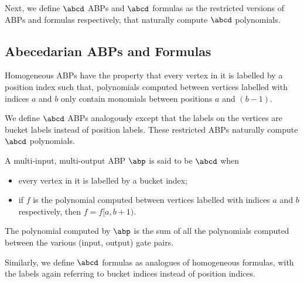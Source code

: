 \hspace{.5em}

\noindent Next, we define $\abcd$ ABPs and $\abcd$ formulas as the restricted versions of ABPs and formulas respectively, that naturally compute $\abcd$ polynomials.

\subsection{Abecedarian ABPs and Formulas}\label{sec:defn_abcd_ABP_form}

Homogeneous ABPs have the property that every vertex in it is labelled by a position index such that, polynomials computed between vertices labelled with indices $a$ and $b$ only contain monomials between positions $a$ and $(b-1)$.

We define $\abcd$ ABPs analogously except that the labels on the vertices are bucket labels instead of position labels. 
These restricted ABPs naturally compute $\abcd$ polynomials.

\begin{definition}\label{def:ordABP}
	A multi-input, multi-output ABP $\abp$ is said to be $\abcd$ when
	\begin{itemize}
		\item every vertex in it is labelled by a bucket index;
		\item if $f$ is the polynomial computed between vertices labelled with indices $a$ and $b$ respectively, then $f = f[a,b+1)$. 
	\end{itemize}
	The polynomial computed by $\abp$ is the sum of all the polynomials computed between the various (input, output) gate pairs.
\end{definition}

Similarly, we define $\abcd$ formulas as analogues of homogeneous formulas, with the labels again referring to bucket indices instead of position indices.

